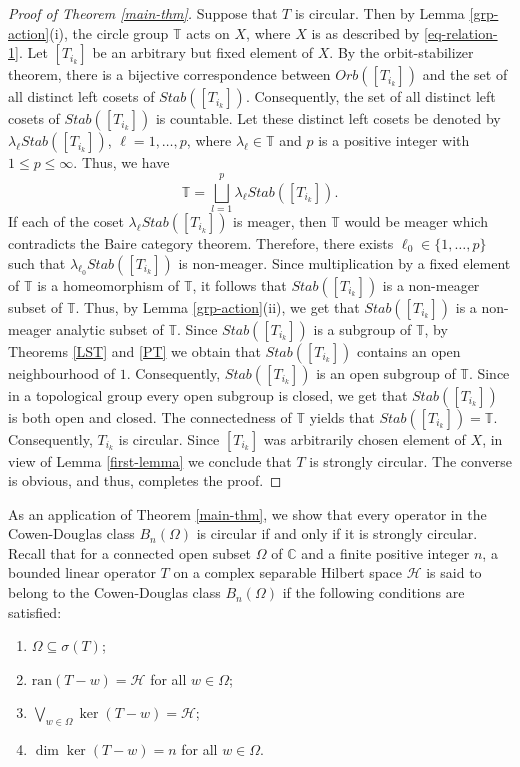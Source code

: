 \documentclass[a4paper,oneside,10pt, reqno]{amsproc}
\theoremstyle{remark}
\theoremstyle{definition}
\begin{document}
\begin{proof}[Proof of Theorem \ref{main-thm}]
Suppose that $T$ is circular. Then by Lemma \ref{grp-action}(i), the circle group $\mathbb T$ acts on $X$, where $X$ is as described by \eqref{eq-relation-1}. Let $[T_{i_k}]$ be an arbitrary but fixed element of $X$. By the orbit-stabilizer theorem, there is a bijective correspondence between $Orb([T_{i_k}])$ and the set of all distinct left cosets of $Stab([T_{i_k}])$. Consequently, the set of all distinct left cosets of $Stab([T_{i_k}])$ is countable. Let these distinct left cosets be denoted by $\lambda_\ell Stab([T_{i_k}])$, $\ell = 1, \ldots, p$, where $\lambda_\ell \in \mathbb T$ and $p$ is a positive integer with $1 \leqslant p \leqslant \infty$. Thus, we have
\[\mathbb T = \bigsqcup_{l=1}^p \lambda_\ell Stab([T_{i_k}]).\]
If each of the coset $\lambda_\ell Stab([T_{i_k}])$ is meager, then $\mathbb T$ would be meager which contradicts the Baire category theorem. Therefore, there exists $\ell_0 \in \{1, \ldots, p\}$ such that $\lambda_{\ell_0} Stab([T_{i_k}])$ is non-meager. Since multiplication by a fixed element of $\mathbb T$ is a homeomorphism of $\mathbb T$, it follows that $Stab([T_{i_k}])$ is a non-meager subset of $\mathbb T$. Thus, by Lemma \ref{grp-action}(ii), we get that $Stab([T_{i_k}])$ is a non-meager analytic subset of $\mathbb T$. Since $Stab([T_{i_k}])$ is a subgroup of $\mathbb T$, by Theorems \ref{LST} and \ref{PT} we obtain that $Stab([T_{i_k}])$ contains an open neighbourhood of $1$. Consequently, $Stab([T_{i_k}])$ is an open subgroup of $\mathbb T$. Since in a topological group every open subgroup is closed, we get that $Stab([T_{i_k}])$ is both open and closed. The connectedness of $\mathbb T$ yields that $Stab([T_{i_k}]) = \mathbb T$. Consequently, $T_{i_k}$ is circular. Since $[T_{i_k}]$ was arbitrarily chosen element of $X$, in view of Lemma \ref{first-lemma} we conclude that $T$ is strongly circular. The converse is obvious, and thus, completes the proof.
\end{proof}

As an application of Theorem \ref{main-thm}, we show that every operator in the Cowen-Douglas class $B_n(\Omega)$ is circular if and only if it is strongly circular. Recall that for a connected open subset $\Omega$ of $\mathbb C$ and a finite positive integer $n$, a bounded linear operator $T$ on a complex separable Hilbert space $\mathcal H$ is said to belong to the Cowen-Douglas class $B_n(\Omega)$ if the following conditions are satisfied:
\begin{enumerate}
\item[(i)] $\Omega \subseteq \sigma(T)$;
\item[(ii)] $\text{ran}(T-w) = \mathcal H$ for all $w \in \Omega$;
\item[(iii)] $\bigvee_{w \in \Omega} \ker (T-w) = \mathcal H$;
\item[(iv)] $\dim \ker (T-w) = n$ for all $w \in \Omega$.
\end{enumerate}  
\end{document}
